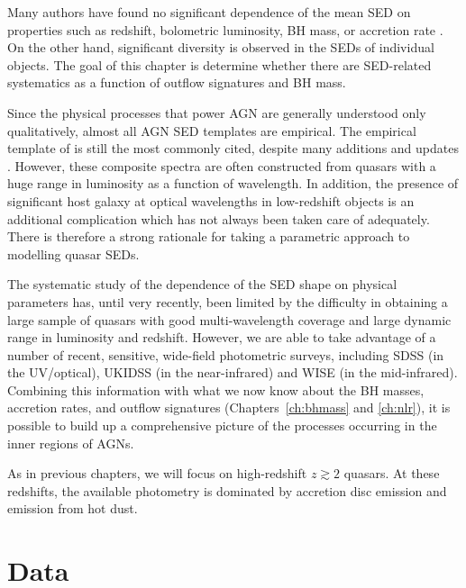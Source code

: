 Many authors have found no significant dependence of the mean \ac{SED} on properties such as redshift, bolometric luminosity, \ac{BH} mass, or accretion rate \citep[e.g.][]{elvis12,hao13}. 
On the other hand, significant diversity is observed in the \ac{SED}s of individual objects. 
The goal of this chapter is determine whether there are \ac{SED}-related systematics as a function of outflow signatures and \ac{BH} mass. 

Since the physical processes that power \ac{AGN} are generally understood only qualitatively, almost all \ac{AGN} \ac{SED} templates are empirical. 
The empirical template of \citet{elvis94} is still the most commonly cited, despite many additions and updates \citep[e.g.][]{polletta00, kuraszkiewicz03, risaliti04, richards06,  polletta07, lusso10, shang11, marchese12, trichas12}. 
However, these composite spectra are often constructed from quasars with a huge range in luminosity as a function of wavelength. 
In addition, the presence of significant host galaxy at optical wavelengths in low-redshift objects is an additional complication which has not always been taken care of adequately. 
There is therefore a strong rationale for taking a parametric approach to modelling quasar \ac{SED}s. 

The systematic study of the dependence of the \ac{SED} shape on physical parameters has, until very recently, been limited by the difficulty in obtaining a large sample of quasars with good multi-wavelength coverage and large dynamic range in luminosity and redshift. 
However, we are able to take advantage of a number of recent, sensitive, wide-field photometric surveys, including SDSS (in the UV/optical), UKIDSS (in the near-infrared) and WISE (in the mid-infrared).
Combining this information with what we now know about the \ac{BH} masses, accretion rates, and outflow signatures (Chapters~\ref{ch:bhmass} and \ref{ch:nlr}), it is possible to build up a comprehensive picture of the processes occurring in the inner regions of \ac{AGN}s. 

As in previous chapters, we will focus on high-redshift $z\gtrsim2$ quasars. 
At these redshifts, the available photometry is dominated by accretion disc emission and emission from hot dust. 


\section{Data}

